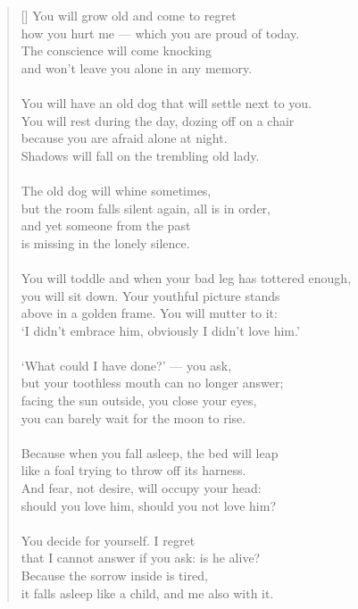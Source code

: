 \documentclass[a4paper,12pt,twoside,final]{book}
\begin{document}
\begin{verse}[\versewidth]
  You will grow old and come to regret \\
  how you hurt me --- which you are proud of today. \\
  The conscience will come knocking \\
  and won't leave you alone in any memory. \\
  \ \\
  You will have an old dog that will settle next to you. \\
  You will rest during the day, dozing off on a chair \\
  because you are afraid alone at night. \\
  Shadows will fall on the trembling old lady. \\
  \ \\
  The old dog will whine sometimes, \\
  but the room falls silent again, all is in order, \\
  and yet someone from the past \\
  is missing in the lonely silence. \\
  \ \\
  You will toddle and when your bad leg has tottered enough, \\
  you will sit down. Your youthful picture stands \\
  above in a golden frame. You will mutter to it: \\
  `I didn't embrace him, obviously I didn't love him.' \\
  \ \\
  `What could I have done?' --- you ask, \\
  but your toothless mouth can no longer answer; \\
  facing the sun outside, you close your eyes, \\
  you can barely wait for the moon to rise. \\
  \ \\
  Because when you fall asleep, the bed will leap \\
  like a foal trying to throw off its harness. \\
  And fear, not desire, will occupy your head: \\
  should you love him, should you not love him? \\
  \ \\
  You decide for yourself. I regret \\
  that I cannot answer if you ask: is he alive? \\
  Because the sorrow inside is tired, \\
  it falls asleep like a child, and me also with it. \\
\end{verse}
\end{document}
